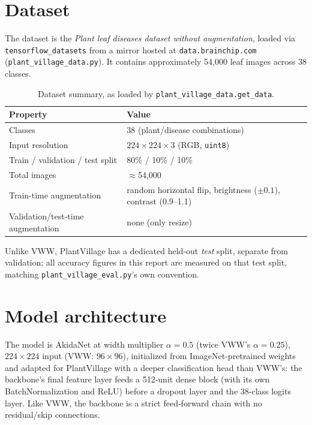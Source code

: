 \documentclass[11pt]{article}
\newcommand{\code}[1]{\texttt{#1}}
\begin{document}
\section{Dataset}

The dataset is the \emph{Plant leaf diseases dataset without augmentation}, loaded via \code{tensorflow\_datasets} from a mirror hosted at \code{data.\allowbreak brainchip.\allowbreak com} (\code{plant\_village\_data.py}). It contains approximately 54,000 leaf images across 38 classes.

\begin{table}[H]
\centering
\caption{Dataset summary, as loaded by \code{plant\_village\_data.get\_data}.}
\label{tab:dataset}
\begin{tabular}{@{}ll@{}}
\toprule
Property & Value \\
\midrule
Classes & 38 (plant/disease combinations) \\
Input resolution & $224 \times 224 \times 3$ (RGB, \code{uint8}) \\
Train / validation / test split & 80\% / 10\% / 10\% \\
Total images & $\approx$54{,}000 \\
Train-time augmentation & random horizontal flip, brightness ($\pm0.1$), contrast (0.9--1.1) \\
Validation/test-time augmentation & none (only resize) \\
\bottomrule
\end{tabular}
\end{table}

Unlike VWW, PlantVillage has a dedicated held-out \emph{test} split, separate from validation; all accuracy figures in this report are measured on that test split, matching \code{plant\_village\_eval.py}'s own convention.

\section{Model architecture}
\label{sec:architecture}

The model is AkidaNet at width multiplier $\alpha=0.5$ (twice VWW's $\alpha=0.25$), $224\times224$ input (VWW: $96\times96$), initialized from ImageNet-pretrained weights and adapted for PlantVillage with a deeper classification head than VWW's: the backbone's final feature layer feeds a 512-unit dense block (with its own BatchNormalization and ReLU) before a dropout layer and the 38-class logits layer. Like VWW, the backbone is a strict feed-forward chain with no residual/skip connections.
\end{document}
